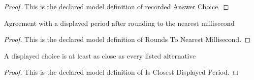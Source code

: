 \begin{proof}
  This is the declared model definition of recorded Answer Choice.
\end{proof}
\begin{definition}
  \label{def:physics:phyx-mini-0264:phyxminiproblems-problemphyxmini0264-roundstonearestmillisecond}
  Agreement with a displayed period after rounding to the nearest millisecond
\end{definition}
\begin{proof}
  This is the declared model definition of Rounds To Nearest Millisecond.
\end{proof}
\begin{definition}
  \label{def:physics:phyx-mini-0264:phyxminiproblems-problemphyxmini0264-isclosestdisplayedperiod}
  A displayed choice is at least as close as every listed alternative
\end{definition}
\begin{proof}
  This is the declared model definition of Is Closest Displayed Period.
\end{proof}
